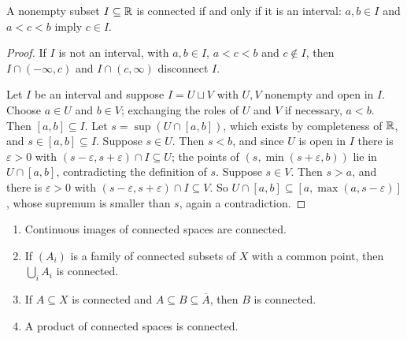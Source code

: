 \begin{theorem}\label{general-topology:theorem-intervals-connected}
A nonempty subset $I \subseteq \mathbb{R}$ is connected if and only if it is an interval: $a, b \in I$ and $a < c < b$ imply $c \in I$.
\end{theorem}

\begin{proof}
If $I$ is not an interval, with $a, b \in I$, $a < c < b$ and $c \notin I$, then $I \cap (-\infty, c)$ and $I \cap (c, \infty)$ disconnect $I$.

Let $I$ be an interval and suppose $I = U \sqcup V$ with $U, V$ nonempty and open in $I$. Choose $a \in U$ and $b \in V$; exchanging the roles of $U$ and
$V$ if necessary, $a < b$. Then $[a, b] \subseteq I$. Let $s = \sup(U \cap [a, b])$, which exists by completeness of $\mathbb{R}$, and $s \in [a, b] \subseteq I$.
Suppose $s \in U$. Then $s < b$, and since $U$ is open in $I$ there is $\varepsilon > 0$ with $(s - \varepsilon, s + \varepsilon) \cap I \subseteq U$; the
points of $(s, \min(s + \varepsilon, b))$ lie in $U \cap [a, b]$, contradicting the definition of $s$. Suppose $s \in V$. Then $s > a$, and there is
$\varepsilon > 0$ with $(s - \varepsilon, s + \varepsilon) \cap I \subseteq V$. So $U \cap [a, b] \subseteq [a, \max(a, s - \varepsilon)]$, whose supremum is
smaller than $s$, again a contradiction.
\end{proof}

\begin{proposition}\label{general-topology:proposition-connected-operations}
\begin{enumerate}
\item Continuous images of connected spaces are connected.
\item If $(A_i)$ is a family of connected subsets of $X$ with a common point, then $\bigcup_i A_i$ is connected.
\item If $A \subseteq X$ is connected and $A \subseteq B \subseteq \overline{A}$, then $B$ is connected.
\item A product of connected spaces is connected.
\end{enumerate}
\end{proposition}

